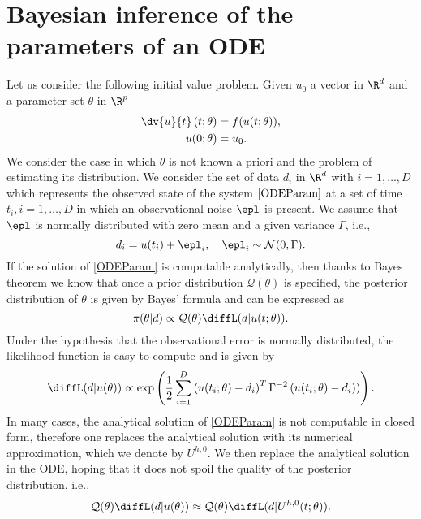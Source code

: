 \section{Bayesian inference of the parameters of an ODE}

Let us consider the following initial value problem. Given $u_0$ a vector in $\R^d$ and a parameter set $\theta$ in $\R^p$
\begin{equation}\label{ODEParam}
\begin{aligned}
	\dv{u}{t}\left(t; \theta\right) &= f(u(t;\theta)),\\
	u(0; \theta) &= u_0.
\end{aligned}
\end{equation}
We consider the case in which $\theta$ is not known a priori and the problem of estimating its distribution. We consider the set of data $d_i$ in $\R^d$ with $i = 1, \ldots, D$ which represents the observed state of the system $\eqref{ODEParam}$ at a set of time $t_i, i = 1, \ldots, D$ in which an observational noise $\epl$ is present. We assume that $\epl$ is normally distributed with zero mean and a given variance $\Gamma$, i.e.,
\begin{equation}
	d_i = u(t_i) + \epl_i, \quad \epl_i \sim \mathcal{N}(0, \Gamma).
\end{equation} 
If the solution of \eqref{ODEParam} is computable analytically, then thanks to Bayes theorem we know that once a prior distribution $\mathcal{Q}(\theta)$ is specified, the posterior distribution of $\theta$ is given by Bayes' formula and can be expressed as
\begin{equation}\label{BayesFormulaODE}
	\pi(\theta|d) \propto \mathcal{Q}(\theta) \diffL(d|u(t;\theta)).
\end{equation}
 Under the hypothesis that the observational error is normally distributed, the likelihood function is easy to compute and is given by
 \begin{equation}\label{likelihood}
	 \diffL(d|u(\theta)) \propto \exp\left(\frac{1}{2}\sum_{i=1}^{D}\left(u(t_i;\theta) - d_i\right)^T \Gamma^{-2} \left(u(t_i;\theta) - d_i) \right)\right).
 \end{equation}
 In many cases, the analytical solution of \eqref{ODEParam} is not computable in closed form, therefore one replaces the analytical solution with its numerical approximation, which we denote by $U^{h,0}$. We then replace the analytical solution in the ODE, hoping that it does not spoil the quality of the posterior distribution, i.e.,
 \begin{equation}
	 \mathcal{Q}(\theta) \diffL(d|u(\theta)) \approx \mathcal{Q}(\theta) \diffL(d|U^{h,0}(t;\theta)).
 \end{equation}

